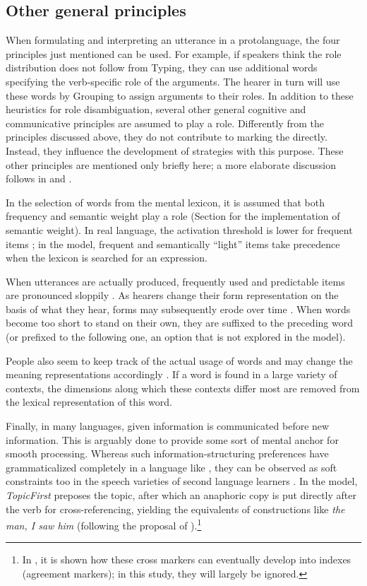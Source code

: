 \documentclass[output=paper]{LSP/langsci}
\begin{document}
\subsection{Other general principles}\label{17-le-sec:Other}
When formulating and interpreting an utterance in a protolanguage, the four principles just mentioned can be used. For example, if speakers think the role distribution does not follow from Typing, they can use additional words specifying the verb-specific role of the arguments. The hearer in turn will use these words by Grouping to assign arguments to their roles. In addition to these heuristics for role disambiguation, several other general cognitive and communicative principles are assumed to play a role. Differently from the principles discussed above, they do not contribute to marking the  directly. Instead, they influence the development of strategies with this purpose. These other principles are mentioned only briefly here; a more elaborate discussion follows in  and .

In the selection of words from the mental lexicon, it is assumed that both frequency and semantic weight play a role (\cf Section  for the implementation of semantic weight). In real language, the activation threshold is lower for frequent items \citep{Balotaetal1985Locus}; in the model, frequent and semantically ``light'' items take precedence when the lexicon is searched for an expression. 

When utterances are actually produced, frequently used and predictable items are pronounced sloppily \citep{Jurafskyetal2001Probabilistic}. As hearers change their form representation on the basis of what they hear, forms may subsequently erode over time \citep{Nettle1999Linguistic}. When words become too short to stand on their own, they are suffixed to the preceding word (or prefixed to the following one, an option that is not explored in the model).

People also seem to keep track of the actual usage of words and may change the meaning representations accordingly \citep{Bybee2010Language}. If a word is found in a large variety of contexts, the dimensions along which these contexts differ most are removed from the lexical representation of this word. 

Finally, in many languages, given information is communicated before new information. This is arguably done to provide some sort of mental anchor for smooth processing. Whereas such information-structuring preferences have grammaticalized completely in a language like  \citep{Kiss2002Syntax}, they can be observed as soft constraints too in the speech varieties of second language learners \citep{Kleietal1997Basic}. In the model, \textit{TopicFirst} preposes the topic, after which an anaphoric copy is put directly after the verb for cross-referencing, yielding the equivalents of constructions like \textit{the man, I saw him} (following the proposal of \citealt{Givon1995Functionalism}).\footnote{In \citet{Lestrade2015Simulating}, it is shown how these cross markers can eventually develop into indexes (agreement markers); in this study, they will largely be ignored.} 
\end{document}
